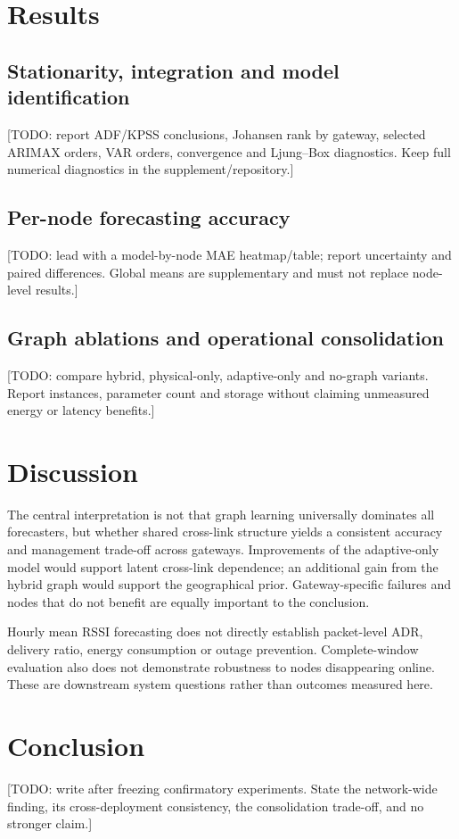 \documentclass[preprint,12pt]{elsarticle}
\begin{document}
\section{Results}
\subsection{Stationarity, integration and model identification}
[TODO: report ADF/KPSS conclusions, Johansen rank by gateway, selected ARIMAX orders,
VAR orders, convergence and Ljung--Box diagnostics. Keep full numerical diagnostics in
the supplement/repository.]

\subsection{Per-node forecasting accuracy}
[TODO: lead with a model-by-node MAE heatmap/table; report uncertainty and paired
differences. Global means are supplementary and must not replace node-level results.]

\subsection{Graph ablations and operational consolidation}
[TODO: compare hybrid, physical-only, adaptive-only and no-graph variants. Report
instances, parameter count and storage without claiming unmeasured energy or latency
benefits.]

\section{Discussion}
The central interpretation is not that graph learning universally dominates all
forecasters, but whether shared cross-link structure yields a consistent accuracy and
management trade-off across gateways. Improvements of the adaptive-only model would
support latent cross-link dependence; an additional gain from the hybrid graph would
support the geographical prior. Gateway-specific failures and nodes that do not
benefit are equally important to the conclusion.

Hourly mean RSSI forecasting does not directly establish packet-level ADR, delivery
ratio, energy consumption or outage prevention. Complete-window evaluation also does
not demonstrate robustness to nodes disappearing online. These are downstream system
questions rather than outcomes measured here.

\section{Conclusion}
[TODO: write after freezing confirmatory experiments. State the network-wide finding,
its cross-deployment consistency, the consolidation trade-off, and no stronger claim.]
\end{document}
